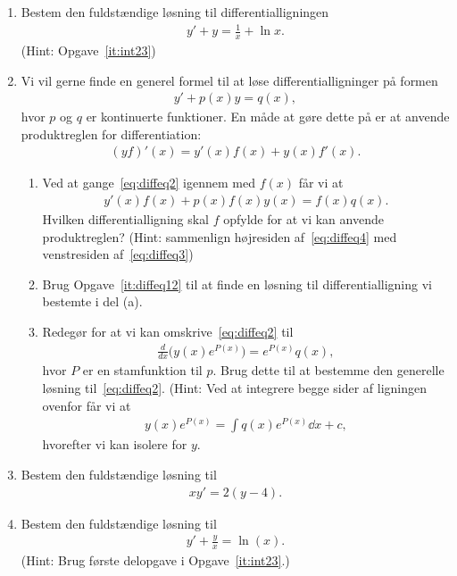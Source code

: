 \begin{enumerate}
	\item Bestem den fuldstændige løsning til differentialligningen
	\begin{align*}
	y'+y=\frac{1}{x}+\ln x.
	\end{align*}
	(Hint: Opgave~\ref{it:int23})
	
	
	\item Vi vil gerne finde en generel formel til at løse differentialligninger på formen
	\begin{align}\label{eq:diffeq2}
	y'+p(x)y=q(x),
	\end{align}
	hvor $p$ og $q$ er kontinuerte funktioner. En måde at gøre dette på er at anvende produktreglen for differentiation:
	\begin{align}\label{eq:diffeq4}
	(yf)'(x)=y'(x)f(x)+y(x)f'(x).
	\end{align}
	\begin{enumerate}
		\item Ved at gange~\eqref{eq:diffeq2} igennem med $f(x)$ får vi at
		\begin{align}\label{eq:diffeq3}
		y'(x)f(x)+p(x)f(x)y(x)=f(x)q(x).
		\end{align}
		Hvilken differentialligning skal $f$ opfylde for at vi kan anvende produktreglen? (Hint: sammenlign højresiden af~\eqref{eq:diffeq4} med venstresiden af~\eqref{eq:diffeq3})
		
		\item Brug Opgave~\ref{it:diffeq12} til at finde en løsning til differentialligning vi bestemte i del (a). 
		
		\item Redegør for at vi kan omskrive~\eqref{eq:diffeq2} til
		\begin{align*}
		\frac{d}{dx} \Big(y(x) e^{P(x)} \Big)=e^{P(x)}q(x),
		\end{align*}
		hvor $P$ er en stamfunktion til $p$. Brug dette til at bestemme den generelle løsning til~\eqref{eq:diffeq2}. (Hint: Ved at integrere begge sider af ligningen ovenfor får vi at
		\begin{align*}
		y(x)e^{P(x)}=\int q(x)e^{P(x)}\dd x+c,
		\end{align*}
		hvorefter vi kan isolere for $y$.
	\end{enumerate}
	
	\item Bestem den fuldstændige løsning til
	\begin{align*}
	xy'=2(y-4).
	\end{align*}
	
	\item Bestem den fuldstændige løsning til 
	\begin{align*}
	y'+\frac{y}{x}=\ln(x).
	\end{align*}
	(Hint: Brug første delopgave i Opgave~\ref{it:int23}.)
	
	
\end{enumerate}